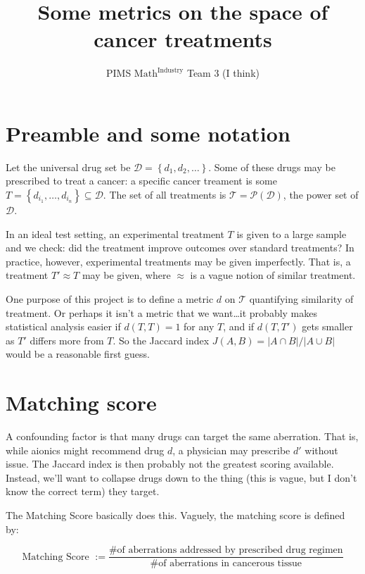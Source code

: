 \documentclass[titlepage, hidelinks, 12pt]{article}
\theoremstyle{plain}
\theoremstyle{remark}
\theoremstyle{definition}
\begin{document}
\title{Some metrics on the space of cancer treatments}
\author{PIMS $\text{Math}^{\text{Industry}}$ Team 3 (I think)}
\maketitle






\newpage

\section{Preamble and some notation}
Let the universal drug set be $\mathcal{D} = \left\{ d_1, d_2, \ldots \right\}$. Some of these drugs may be prescribed to treat a cancer: 
a specific cancer treament is some  $T = \left\{ d_{i_1}, \ldots, d_{i_n} \right\}\subseteq \mathcal{D}$. 
The set of all treatments is $\mathcal{T} = \mathcal{P}(\mathcal{D})$, the power set of $\mathcal{D}$. 

In an ideal test setting, an experimental treatment $T$ is given to a large sample and we check: did the treatment improve outcomes over
standard treatments? In practice, however, experimental treatments may be given imperfectly. That is, a treatment $T' \approx T$ may be given,
where $\approx$ is a vague notion of similar treatment.

One purpose of this project is to define a metric $d$ on $\mathcal{T}$ quantifying similarity of treatment. Or perhaps it isn't a metric that
we want\dots it probably makes statistical analysis easier if $d(T, T) = 1$ for any $T$, and if $d(T, T')$ gets smaller as $T'$ differs more
from $T$. So the Jaccard index $J(A, B) = |A\cap B|/|A\cup B|$ would be a reasonable first guess. 

\section{Matching score}
A confounding factor is that many drugs can target the same aberration. That is, while aionics might recommend drug $d$, a physician may
prescribe $d'$ without issue.  The Jaccard index is then probably not the greatest scoring available. Instead, we'll want to collapse drugs
down to the thing (this is vague, but I don't know the correct term) they target. 

The Matching Score basically does this. Vaguely, the matching score is defined by:

\begin{equation}
    \text{Matching Score }:= \frac{\text{\# of aberrations addressed by prescribed drug regimen}}{\text{\# of aberrations in cancerous tissue}}
    \label{eqn:matchingScore}
\end{equation}
\end{document}
